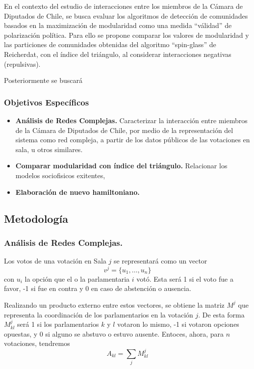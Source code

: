 \documentclass{proyectotesis}
\begin{document}
En el contexto del estudio de interacciones entre los miembros de la Cámara de Diputados de Chile, se busca evaluar los algoritmos de detección de comunidades basados en la maximización de modularidad como una medida ``válidad'' de polarización política. Para ello se propone comparar los valores de modularidad y las particiones de comunidades obtenidas del algoritmo ``spin-glass'' de Reicherdat, con el índice del triángulo, al considerar interacciones negativas (repulsivas). 

Posteriormente se buscará 

\subsubsection*{Objetivos Específicos}
\begin{itemize}
\item    {\bf Análisis de Redes Complejas.} Caracterizar la interacción entre miembros de la Cámara de Diputados de Chile, por medio de la representación del sistema como red compleja, a partir de los datos públicos de las votaciones en sala, u otros similares.

\item{\bf Comparar modularidad con índice del triángulo.} Relacionar los modelos sociofisicos exitentes, 

\item {\bf Elaboración de nuevo hamiltoniano.} 

\end{itemize}

\subsection{Metodología}
\subsubsection{Análisis de Redes Complejas.}

Los votos de una votación en Sala $j$ se representará como un vector 
\begin{equation}
    v^j = \{u_1,\dots,u_n\}
\end{equation}
con $u_i$ la opción que el o la parlamentaria $i$ votó. Esta será 1 si el voto fue a favor, -1 si fue en contra y 0 en caso de abstención o ausencia.

Realizando un producto externo entre estos vectores, se obtiene la matriz $M^j$ que representa la coordinación de los parlamentarios en la votación $j$. De esta forma $M^j_{kl}$ será 1 si los parlamentarios $k$ y $l$ votaron lo mismo, -1 si votaron opciones opuestas, y 0 si alguno se abstuvo o estuvo ausente. Entoces, ahora, para $n$ votaciones, tendremos
\begin{equation}
    A_{kl} = \sum_j M^j_{kl}
\end{equation}
\end{document}
